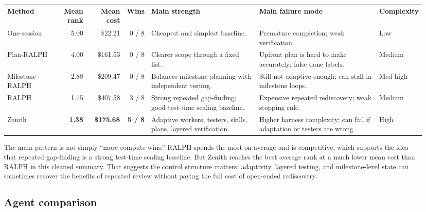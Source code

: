 \documentclass[11pt,a4paper]{article}
\renewcommand{\arraystretch}{1.18}
\newcommand{\code}[1]{#1}
\begin{document}
\begingroup
\renewcommand{\arraystretch}{1.25}
\setlength{\tabcolsep}{5pt}
\footnotesize
\noindent\begin{tabular}{@{}lrrrp{2.7cm}p{3.0cm}l@{}}
\toprule
\rowcolor{tablehead}\textbf{\color{white}Method} & \textbf{\color{white}Mean rank} & \textbf{\color{white}Mean cost} & \textbf{\color{white}Wins} & \textbf{\color{white}Main strength} & \textbf{\color{white}Main failure mode} & \textbf{\color{white}Complexity} \\
\midrule
\code{One-session}    & 5.00 & \$22.21  & 0 / 8 & Cheapest and simplest baseline. & Premature completion; weak verification. & Low \\
\rowcolor{tableband}
\code{Plan-RALPH}     & 4.00 & \$161.53 & 0 / 8 & Clearer scope through a fixed list. & Upfront plan is hard to make accurately; false done labels. & Medium \\
\code{Milestone-RALPH}& 2.88 & \$209.47 & 0 / 8 & Balances milestone planning with independent testing. & Still not adaptive enough; can stall in milestone loops. & Med-high \\
\rowcolor{tableband}
\code{RALPH}          & 1.75 & \$407.58 & 3 / 8 & Strong repeated gap-finding; good test-time scaling baseline. & Expensive repeated rediscovery; weak stopping rule. & Medium \\
\code{Zenith}         & \textbf{1.38} & \textbf{\$175.68} & \textbf{5 / 8} & Adaptive workers, testers, skills, plans, layered verification. & Higher harness complexity; can fail if adaptation or testers are wrong. & High \\
\bottomrule
\end{tabular}
\endgroup

\vspace{6pt}

The main pattern is not simply ``more compute wins.'' \code{RALPH} spends the most on average and is competitive, which supports the idea that repeated gap-finding is a strong test-time scaling baseline. But \code{Zenith} reaches the best average rank at a much lower mean cost than \code{RALPH} in this cleaned summary. That suggests the control structure matters: adaptivity, layered testing, and milestone-level state can sometimes recover the benefits of repeated review without paying the full cost of open-ended rediscovery.

\subsection{Agent comparison}
\end{document}
